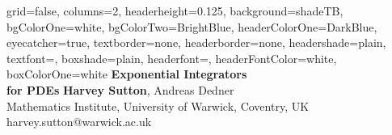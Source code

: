 \documentclass[latin,a0paper,portrait]{xebaposter}
\begin{document}
\begin{poster}{
    grid=false, %
    columns=2, %
    headerheight=0.125\textheight, %
    background=shadeTB,
    bgColorOne=white, %
    bgColorTwo=BrightBlue, %
    headerColorOne=DarkBlue,
    eyecatcher=true, %
    textborder=none,
    headerborder=none,
    headershade=plain,
    textfont=\color{WarwickGrey},
    boxshade=plain,
    headerfont=\Large\sffamily,
    headerFontColor=white,
    boxColorOne=white
}
{
}
{
    \color{WarwickGrey}\sffamily\bfseries
	Exponential Integrators\vspace{6pt}\\
	for PDEs\vspace{10pt}
}
{
    \color{WarwickGrey}
	\textbf{Harvey Sutton}, Andreas Dedner\\
	\vspace{-2pt}
	{\smaller[2] Mathematics Institute, University of Warwick, Coventry, UK}\\
	\vspace{2pt}
	{\smaller[2] harvey.sutton@warwick.ac.uk}
}
{
\hbox{\phantom{\rule{0.3\textwidth}{0.1\textheight}}}

}


\end{poster}
\end{document}
